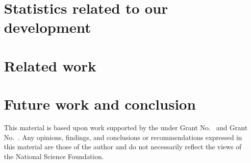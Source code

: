 \documentclass[acmsmall,review,anonymous]{acmart}\settopmatter{printfolios=true,printccs=false,printacmref=false}
\begin{document}
\section{Statistics related to our development}
\label{sec:development}


\section{Related work}
\label{sec:related}


\section{Future work and conclusion}
\label{sec:future}
\label{sec:conclusion}


\begin{acks}                            %
  This material is based upon work supported by the
   under Grant
  No.~ and Grant
  No.~.  Any opinions, findings, and
  conclusions or recommendations expressed in this material are those
  of the author and do not necessarily reflect the views of the
  National Science Foundation.
\end{acks}





\end{document}
